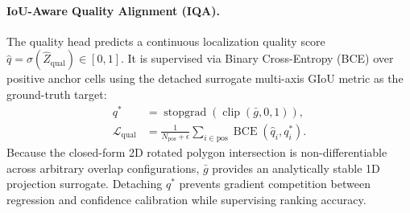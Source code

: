 \paragraph{IoU-Aware Quality Alignment (IQA).}
The quality head predicts a continuous localization quality score $\hat{q} = \sigma(\hat{Z}_{\mathrm{qual}}) \in [0, 1]$. It is supervised via Binary Cross-Entropy (BCE) over positive anchor cells using the detached surrogate multi-axis GIoU metric as the ground-truth target:
\begin{equation}
    \begin{aligned}
        q^* &= \operatorname{stopgrad}(\operatorname{clip}(\bar{g}, 0, 1)), \\
        \mathcal{L}_{\mathrm{qual}} &= \frac{1}{N_{\mathrm{pos}} + \epsilon} \sum_{i \in \mathrm{pos}} \operatorname{BCE}(\hat{q}_i, q_i^*).
    \end{aligned}
    \label{eq:iqa_loss}
\end{equation}
Because the closed-form 2D rotated polygon intersection is non-differentiable across arbitrary overlap configurations, $\bar{g}$ provides an analytically stable 1D projection surrogate. Detaching $q^*$ prevents gradient competition between regression and confidence calibration while supervising ranking accuracy.

